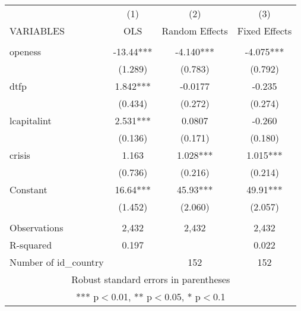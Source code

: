 {
\begin{tabular}{lccc} \hline
 & (1) & (2) & (3) \\
VARIABLES & OLS & Random Effects & Fixed Effects \\ \hline
 &  &  &  \\
openess & -13.44*** & -4.140*** & -4.075*** \\
 & (1.289) & (0.783) & (0.792) \\
dtfp & 1.842*** & -0.0177 & -0.235 \\
 & (0.434) & (0.272) & (0.274) \\
lcapitalint & 2.531*** & 0.0807 & -0.260 \\
 & (0.136) & (0.171) & (0.180) \\
crisis & 1.163 & 1.028*** & 1.015*** \\
 & (0.736) & (0.216) & (0.214) \\
Constant & 16.64*** & 45.93*** & 49.91*** \\
 & (1.452) & (2.060) & (2.057) \\
 &  &  &  \\
Observations & 2,432 & 2,432 & 2,432 \\
R-squared & 0.197 &  & 0.022 \\
 Number of id\_country &  & 152 & 152 \\ \hline
\multicolumn{4}{c}{ Robust standard errors in parentheses} \\
\multicolumn{4}{c}{ *** p$<$0.01, ** p$<$0.05, * p$<$0.1} \\
\end{tabular}
}
